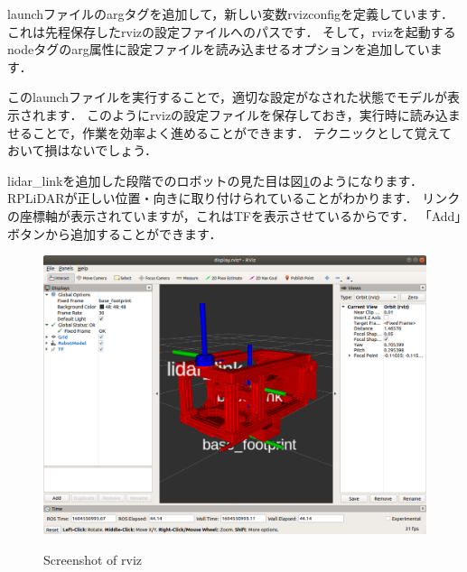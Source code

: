 \documentclass[{../../master}]{subfiles}
\begin{document}
launchファイルの\textsf{arg}タグを追加して，新しい変数\textsf{rvizconfig}を定義しています．
これは先程保存した\textsf{rviz}の設定ファイルへのパスです．
そして，\textsf{rviz}を起動する\textsf{node}タグの\textsf{arg}属性に設定ファイルを読み込ませるオプションを追加しています．

このlaunchファイルを実行することで，適切な設定がなされた状態でモデルが表示されます．
このように\textsf{rviz}の設定ファイルを保存しておき，実行時に読み込ませることで，作業を効率よく進めることができます．
テクニックとして覚えておいて損はないでしょう．

\textsf{lidar\_link}を追加した段階でのロボットの見た目は図\ref{fig:lidar_link_visualization}のようになります．
RPLiDARが正しい位置・向きに取り付けられていることがわかります．
リンクの座標軸が表示されていますが，これは\textsf{TF}を表示させているからです．
「Add」ボタンから追加することができます．

\begin{figure}[ht]
  \centering
  \includegraphics[height=50truemm]{images/lidar_link_visualization.png}
  \label{fig:lidar_link_visualization}
  \caption{Screenshot of \textsf{rviz}}
\end{figure}
\end{document}
